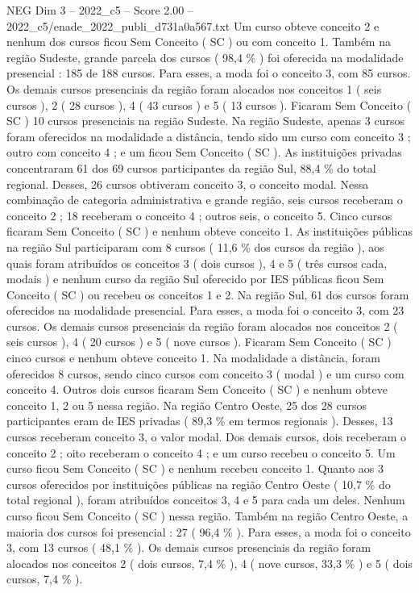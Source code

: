\begin{textsample}{NEG Dim 3 – 2022\_c5 – Score 2.00 – 2022\_c5/enade\_2022\_publi\_d731a0a567.txt}
Um curso obteve conceito 2 e nenhum dos cursos ficou Sem Conceito ( SC ) ou com conceito 1.
Também na região Sudeste, grande parcela dos cursos ( 98,4 \% ) foi oferecida na modalidade presencial : 185 de 188 cursos.
Para esses, a moda foi o conceito 3, com 85 cursos.
Os demais cursos presenciais da região foram alocados nos conceitos 1 ( seis cursos ), 2 ( 28 cursos ), 4 ( 43 cursos ) e 5 ( 13 cursos ).
Ficaram Sem Conceito ( SC ) 10 cursos presenciais na região Sudeste.
Na região Sudeste, apenas 3 cursos foram oferecidos na modalidade a distância, tendo sido um curso com conceito 3 ; outro com conceito 4 ; e um ficou Sem Conceito ( SC ).
As instituições privadas concentraram 61 dos 69 cursos participantes da região Sul, 88,4 \% do total regional.
Desses, 26 cursos obtiveram conceito 3, o conceito modal.
Nessa combinação de categoria administrativa e grande região, seis cursos receberam o conceito 2 ; 18 receberam o conceito 4 ; outros seis, o conceito 5.
Cinco cursos ficaram Sem Conceito ( SC ) e nenhum obteve conceito 1.
As instituições públicas na região Sul participaram com 8 cursos ( 11,6 \% dos cursos da região ), aos quais foram atribuídos os conceitos 3 ( dois cursos ), 4 e 5 ( três cursos cada, modais ) e nenhum curso da região Sul oferecido por IES públicas ficou Sem Conceito ( SC ) ou recebeu os conceitos 1 e 2.
Na região Sul, 61 dos cursos foram oferecidos na modalidade presencial.
Para esses, a moda foi o conceito 3, com 23 cursos.
Os demais cursos presenciais da região foram alocados nos conceitos 2 ( seis cursos ), 4 ( 20 cursos ) e 5 ( nove cursos ).
Ficaram Sem Conceito ( SC ) cinco cursos e nenhum obteve conceito 1.
Na modalidade a distância, foram oferecidos 8 cursos, sendo cinco cursos com conceito 3 ( modal ) e um curso com conceito 4.
Outros dois cursos ficaram Sem Conceito ( SC ) e nenhum obteve conceito 1, 2 ou 5 nessa região.
Na região Centro Oeste, 25 dos 28 cursos participantes eram de IES privadas ( 89,3 \% em termos regionais ).
Desses, 13 cursos receberam conceito 3, o valor modal.
Dos demais cursos, dois receberam o conceito 2 ; oito receberam o conceito 4 ; e um curso recebeu o conceito 5.
Um curso ficou Sem Conceito ( SC ) e nenhum recebeu conceito 1.
Quanto aos 3 cursos oferecidos por instituições públicas na região Centro Oeste ( 10,7 \% do total regional ), foram atribuídos conceitos 3, 4 e 5 para cada um deles.
Nenhum curso ficou Sem Conceito ( SC ) nessa região.
Também na região Centro Oeste, a maioria dos cursos foi presencial : 27 ( 96,4 \% ).
Para esses, a moda foi o conceito 3, com 13 cursos ( 48,1 \% ).
Os demais cursos presenciais da região foram alocados nos conceitos 2 ( dois cursos, 7,4 \% ), 4 ( nove cursos, 33,3 \% ) e 5 ( dois cursos, 7,4 \% ).

\end{textsample}

